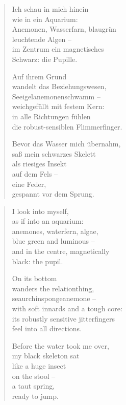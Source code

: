 
\cleartoverso


\begin{verse}

Ich schau in mich hinein\\
wie in ein Aquarium:\\
Anemonen, Wasserfarn, blaugrün\\
leuchtende Algen --\\
im Zentrum ein magnetisches\\
Schwarz: die Pupille.

Auf ihrem Grund\\
wandelt das Beziehungswesen,\\
Seeigelanemonenschwamm --\\
weichgefüllt mit festem Kern:\\
in alle Richtungen fühlen\\
die robust-sensiblen Flimmerfinger.

Bevor das Wasser mich übernahm,\\
saß mein schwarzes Skelett\\
als riesiges Insekt\\
auf dem Fels --\\
eine Feder,\\
gespannt vor dem Sprung.
\end{verse}

\clearpage


\begin{verse}

I look into myself,\\
as if into an aquarium:\\
anemones, waterfern, algae,\\
blue green and luminous --\\
and in the centre, magnetically\\
black: the pupil.

On its bottom\\
wanders the relationthing,\\
seaurchinspongeanemone --\\
with soft innards and a tough core:\\
its robustly sensitive jitterfingers\\
feel into all directions.

Before the water took me over,\\
my black skeleton sat\\
like a huge insect\\
on the stool --\\
a taut spring,\\
ready to jump.
\end{verse}

